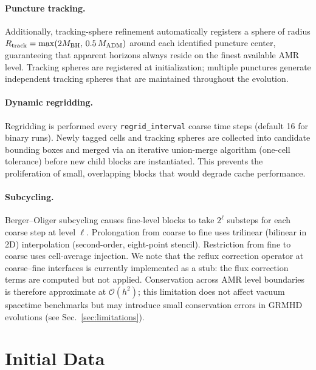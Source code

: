 \documentclass[aps,prd,twocolumn,superscriptaddress,nofootinbib,showpacs,
               longbibliography]{revtex4-2}
\newcommand{\code}[1]{\texttt{#1}}
\newcommand{\order}[1]{\mathcal{O}(#1)}
\begin{document}
\paragraph{Puncture tracking.}
Additionally, tracking-sphere refinement automatically registers a sphere of
radius $R_{\rm track} = \max(2M_{\rm BH},\,0.5\,M_{\rm ADM})$ around each
identified puncture center, guaranteeing that apparent horizons always reside
on the finest available AMR level.
Tracking spheres are registered at initialization; multiple punctures generate
independent tracking spheres that are maintained throughout the evolution.

\paragraph{Dynamic regridding.}
Regridding is performed every \code{regrid\_interval} coarse time steps
(default 16 for binary runs).
Newly tagged cells and tracking spheres are collected into candidate bounding
boxes and merged via an iterative union-merge algorithm (one-cell tolerance)
before new child blocks are instantiated.
This prevents the proliferation of small, overlapping blocks that would
degrade cache performance.

\paragraph{Subcycling.}
Berger--Oliger subcycling causes fine-level blocks to take $2^\ell$
substeps for each coarse step at level $\ell$.
Prolongation from coarse to fine uses trilinear (bilinear in 2D) interpolation
(second-order, eight-point stencil).
Restriction from fine to coarse uses cell-average injection.
We note that the reflux correction operator at coarse--fine interfaces is
currently implemented as a stub: the flux correction terms are computed but
not applied.
Conservation across AMR level boundaries is therefore approximate at
$\order{h^2}$; this limitation does not affect vacuum spacetime benchmarks
but may introduce small conservation errors in GRMHD evolutions
(see Sec.~\ref{sec:limitations}).

\section{Initial Data}
\label{sec:initial_data}
\end{document}
